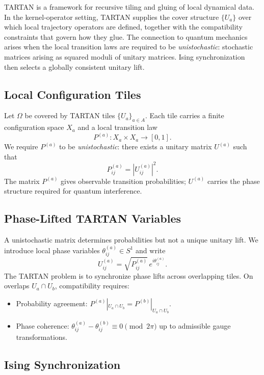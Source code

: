 \documentclass[12pt]{article}
\begin{document}
TARTAN is a framework for recursive tiling and gluing of local dynamical
data. In the kernel-operator setting, TARTAN supplies the cover structure
$\{U_a\}$ over which local trajectory operators are defined, together with
the compatibility constraints that govern how they glue. The connection to
quantum mechanics arises when the local transition laws are required to be
\emph{unistochastic}: stochastic matrices arising as squared moduli of
unitary matrices. Ising synchronization then selects a globally consistent
unitary lift.

\subsection{Local Configuration Tiles}

Let $\Omega$ be covered by TARTAN tiles $\{U_a\}_{a \in A}$. Each tile
carries a finite configuration space $X_a$ and a local transition law
\[
  P^{(a)} \colon X_a \times X_a \to [0,1].
\]
We require $P^{(a)}$ to be \emph{unistochastic}: there exists a unitary
matrix $U^{(a)}$ such that
\[
  P^{(a)}_{ij} = \left|U^{(a)}_{ij}\right|^2.
\]
The matrix $P^{(a)}$ gives observable transition probabilities; $U^{(a)}$
carries the phase structure required for quantum interference.

\subsection{Phase-Lifted TARTAN Variables}

A unistochastic matrix determines probabilities but not a unique unitary
lift. We introduce local phase variables $\theta^{(a)}_{ij} \in S^1$ and write
\[
  U^{(a)}_{ij} = \sqrt{P^{(a)}_{ij}}\, e^{i\theta^{(a)}_{ij}}.
\]
The TARTAN problem is to synchronize phase lifts across overlapping tiles.
On overlaps $U_a \cap U_b$, compatibility requires:
\begin{itemize}
  \item Probability agreement: $P^{(a)}|_{U_a\cap U_b} = P^{(b)}|_{U_a\cap U_b}$.
  \item Phase coherence: $\theta^{(a)}_{ij} - \theta^{(b)}_{ij} \equiv 0
    \pmod{2\pi}$ up to admissible gauge transformations.
\end{itemize}

\subsection{Ising Synchronization}
\end{document}
